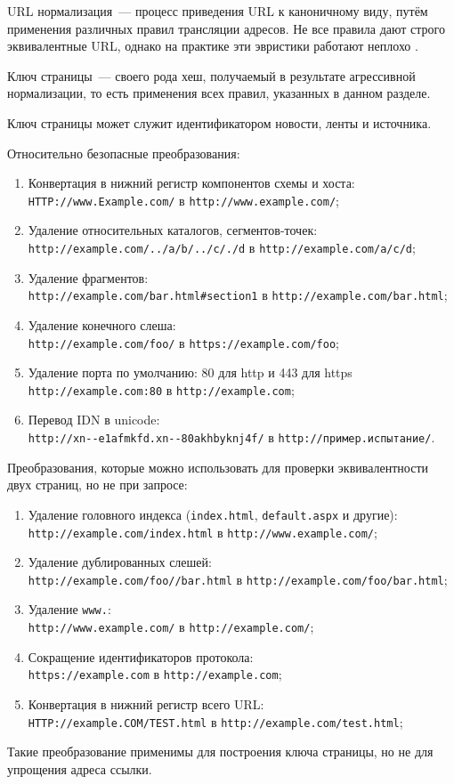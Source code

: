 URL нормализация~--- процесс приведения URL к каноничному виду, путём применения различных правил трансляции адресов. Не все правила дают строго эквивалентные URL, однако на практике эти эвристики работают неплохо \cite{pant04}.

Ключ страницы~--- своего рода хеш, получаемый в результате агрессивной нормализации, то есть применения всех правил, указанных в данном разделе.

Ключ страницы может служит идентификатором новости, ленты и источника.

Относительно безопасные преобразования:
\begin{enumerate}
    \item Конвертация в нижний регистр компонентов схемы и хоста: \\ \verb|HTTP://www.Example.com/| в \verb|http://www.example.com/|;
    \item Удаление относительных каталогов, сегментов-точек: \\ \verb|http://example.com/../a/b/../c/./d| в \verb|http://example.com/a/c/d|;
    \item Удаление фрагментов: \\ \verb|http://example.com/bar.html#section1| в \verb|http://example.com/bar.html|;
    \item Удаление конечного слеша: \\ \verb|http://example.com/foo/| в \verb|https://example.com/foo|;
    \item Удаление порта по умолчанию: 80 для http и 443 для https \\ \verb|http://example.com:80| в \verb|http://example.com|;
    \item Перевод IDN в unicode: \\ \verb|http://xn--e1afmkfd.xn--80akhbyknj4f/| в \verb|http://пример.испытание/|.
\end{enumerate}

Преобразования, которые можно использовать для проверки эквивалентности двух страниц, но не при запросе:
\begin{enumerate}
    \item Удаление головного индекса (\verb|index.html|, \verb|default.aspx| и другие): \\ \verb|http://example.com/index.html| в \verb|http://www.example.com/|;
    \item Удаление дублированных слешей: \\ \verb|http://example.com/foo//bar.html| в \verb|http://example.com/foo/bar.html|;
    \item Удаление \verb|www.|: \\ \verb|http://www.example.com/| в \verb|http://example.com/|;
    \item Сокращение идентификаторов протокола: \\ \verb|https://example.com| в \verb|http://example.com|;
    \item Конвертация в нижний регистр всего URL: \\ \verb|HTTP://example.COM/TEST.html| в \verb|http://example.com/test.html|;
\end{enumerate}

Такие преобразование применимы для построения ключа страницы, но не для упрощения адреса ссылки.
